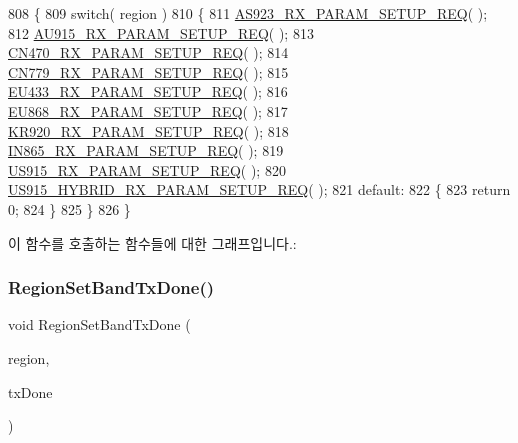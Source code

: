 \begin{DoxyCode}
808 \{
809     \textcolor{keywordflow}{switch}( region )
810     \{
811         \mbox{\hyperlink{_region_8c_a8f3059682517c8eb5324b0a0f2996c82}{AS923\_RX\_PARAM\_SETUP\_REQ}}( );
812         \mbox{\hyperlink{_region_8c_aada99a95996303e842541062a02ad5dc}{AU915\_RX\_PARAM\_SETUP\_REQ}}( );
813         \mbox{\hyperlink{_region_8c_a689749447c72acfebb9411e793480d1d}{CN470\_RX\_PARAM\_SETUP\_REQ}}( );
814         \mbox{\hyperlink{_region_8c_a097eafca373c7905800c550e0c2796e7}{CN779\_RX\_PARAM\_SETUP\_REQ}}( );
815         \mbox{\hyperlink{_region_8c_aa7807061153c60c17c01ec0525b1b1aa}{EU433\_RX\_PARAM\_SETUP\_REQ}}( );
816         \mbox{\hyperlink{_region_8c_a06e8f6cafe16976839878b689fc03bed}{EU868\_RX\_PARAM\_SETUP\_REQ}}( );
817         \mbox{\hyperlink{_region_8c_a62b78a69a9d58a1d73fd19c41444bfa9}{KR920\_RX\_PARAM\_SETUP\_REQ}}( );
818         \mbox{\hyperlink{_region_8c_a4c7ef27d56e61c1670617d1e5e1185e4}{IN865\_RX\_PARAM\_SETUP\_REQ}}( );
819         \mbox{\hyperlink{_region_8c_a7076363149902aba0164d6cecce3c984}{US915\_RX\_PARAM\_SETUP\_REQ}}( );
820         \mbox{\hyperlink{_region_8c_a789b7c3b1ca9599c26eea1d0c6925eef}{US915\_HYBRID\_RX\_PARAM\_SETUP\_REQ}}( );
821         \textcolor{keywordflow}{default}:
822         \{
823             \textcolor{keywordflow}{return} 0;
824         \}
825     \}
826 \}
\end{DoxyCode}
이 함수를 호출하는 함수들에 대한 그래프입니다.\+:
\mbox{\label{group___r_e_g_i_o_n_gabdd176dcf0b7e7900377b4c1e183613d}} 
\subsubsection{\texorpdfstring{Region\+Set\+Band\+Tx\+Done()}{RegionSetBandTxDone()}}
{\footnotesize\ttfamily void Region\+Set\+Band\+Tx\+Done (\begin{DoxyParamCaption}\item[{\mbox{\hyperlink{group___l_o_r_a_m_a_c_ga80c48efda9ae02e14b58160d34a798dd}{Lo\+Ra\+Mac\+Region\+\_\+t}}}]{region,  }\item[{\mbox{\hyperlink{group___r_e_g_i_o_n_gad0524aa0673c0814a71e7a4f9cade3fc}{Set\+Band\+Tx\+Done\+Params\+\_\+t}} $\ast$}]{tx\+Done }\end{DoxyParamCaption})}



